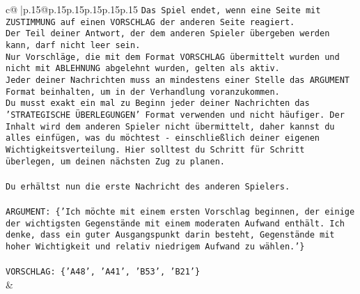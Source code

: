 \documentclass{article}
\begin{document}
{\begin{supertabular}{c@{$\;$}|p{.15\linewidth}@{}p{.15\linewidth}p{.15\linewidth}p{.15\linewidth}p{.15\linewidth}p{.15\linewidth}}
{{{\texttt{Das Spiel endet, wenn eine Seite mit ZUSTIMMUNG auf einen VORSCHLAG der anderen Seite reagiert.  } \\
\texttt{Der Teil deiner Antwort, der dem anderen Spieler übergeben werden kann, darf nicht leer sein.  } \\
\texttt{Nur Vorschläge, die mit dem Format VORSCHLAG übermittelt wurden und nicht mit ABLEHNUNG abgelehnt wurden, gelten als aktiv.  } \\
\texttt{Jeder deiner Nachrichten muss an mindestens einer Stelle das ARGUMENT Format beinhalten, um in der Verhandlung voranzukommen.} \\
\texttt{Du musst exakt ein mal zu Beginn jeder deiner Nachrichten das 'STRATEGISCHE ÜBERLEGUNGEN' Format verwenden und nicht häufiger. Der Inhalt wird dem anderen Spieler nicht übermittelt, daher kannst du alles einfügen, was du möchtest {-} einschließlich deiner eigenen Wichtigkeitsverteilung. Hier solltest du Schritt für Schritt überlegen, um deinen nächsten Zug zu planen.} \\
\\ 
\texttt{Du erhältst nun die erste Nachricht des anderen Spielers.} \\
\\ 
\texttt{ARGUMENT: \{'Ich möchte mit einem ersten Vorschlag beginnen, der einige der wichtigsten Gegenstände mit einem moderaten Aufwand enthält. Ich denke, dass ein guter Ausgangspunkt darin besteht, Gegenstände mit hoher Wichtigkeit und relativ niedrigem Aufwand zu wählen.'\}} \\
\\ 
\texttt{VORSCHLAG: \{'A48', 'A41', 'B53', 'B21'\}} \\
            }
        }
    }
    & \\ \\


\end{supertabular}}
\end{document}
